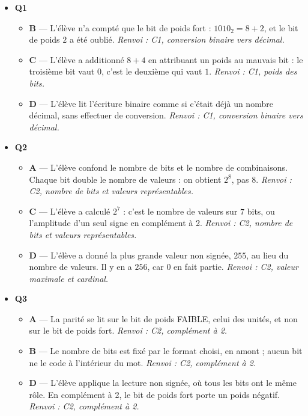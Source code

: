 \begin{itemize}
  \item \textbf{Q1}
  \begin{itemize}
    \item \textbf{B} — L'élève n'a compté que le bit de poids fort : $1010_2 = 8 + 2$, et le bit de poids $2$ a été oublié. \emph{Renvoi : C1, conversion binaire vers décimal.}
    \item \textbf{C} — L'élève a additionné $8+4$ en attribuant un poids au mauvais bit : le troisième bit vaut $0$, c'est le deuxième qui vaut $1$. \emph{Renvoi : C1, poids des bits.}
    \item \textbf{D} — L'élève lit l'écriture binaire comme si c'était déjà un nombre décimal, sans effectuer de conversion. \emph{Renvoi : C1, conversion binaire vers décimal.}
  \end{itemize}
  \item \textbf{Q2}
  \begin{itemize}
    \item \textbf{A} — L'élève confond le nombre de bits et le nombre de combinaisons. Chaque bit double le nombre de valeurs : on obtient $2^8$, pas $8$. \emph{Renvoi : C2, nombre de bits et valeurs représentables.}
    \item \textbf{C} — L'élève a calculé $2^7$ : c'est le nombre de valeurs sur $7$ bits, ou l'amplitude d'un seul signe en complément à 2. \emph{Renvoi : C2, nombre de bits et valeurs représentables.}
    \item \textbf{D} — L'élève a donné la plus grande valeur non signée, $255$, au lieu du nombre de valeurs. Il y en a $256$, car $0$ en fait partie. \emph{Renvoi : C2, valeur maximale et cardinal.}
  \end{itemize}
  \item \textbf{Q3}
  \begin{itemize}
    \item \textbf{A} — La parité se lit sur le bit de poids FAIBLE, celui des unités, et non sur le bit de poids fort. \emph{Renvoi : C2, complément à 2.}
    \item \textbf{B} — Le nombre de bits est fixé par le format choisi, en amont ; aucun bit ne le code à l'intérieur du mot. \emph{Renvoi : C2, complément à 2.}
    \item \textbf{D} — L'élève applique la lecture non signée, où tous les bits ont le même rôle. En complément à 2, le bit de poids fort porte un poids négatif. \emph{Renvoi : C2, complément à 2.}
  \end{itemize}

\end{itemize}
